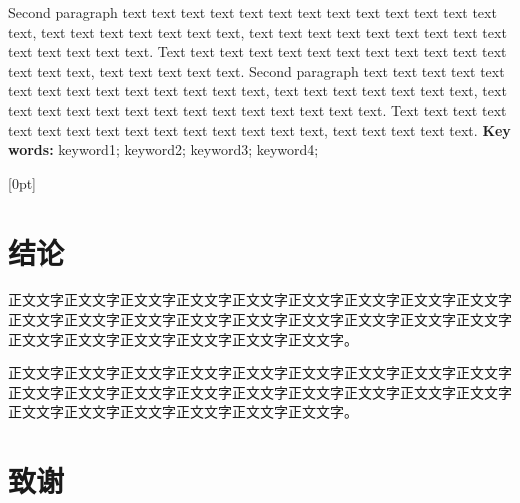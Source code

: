 \documentclass[
	StudentName     = ,
	StudentNameEng	= {{Name of Graduate (such as HAN Bao-cheng)}},
	AdvisorName     = {{姓名 职称}},
        AdvisorNameOut     = {{姓名 职称}},
	AdvisorNameEng	= {{Name of Supervisor and Title (such as Prof. FENG Chang-gen)}},
        AdvisorNameEngOut = {{Name of Second Supervisor and Title}},
	StudentID		= xxxxx,
	Major           = {{电子信息硕士}},
	ResearchInterest= {{计算机技术}},
	Department		= XXXX学院,
	DepartmentEng	= {{Name of Department (or School)}},
	SubmitYear		= 202X,
	SubmitMonth		= X,
	SubmitDay		= XX,
	DefenseYear		= 202X,
	DefenseMonth	= X,
	DefenseDay		= XX,
	DefenseDateEng  = {{Date of Submit (such as April 2002)}},
	Title           = {{基于深度强化学习的多无人机协同控制研究}},
	TitleEng        = {{English Title}},
	CLCNumber		= TD235,
	UDCNumber		= 624.152.5
]{cauc_thesis}
\begin{document}
    Second paragraph text text text text text text text text text text text text text text, text text text text text text text, text text text text text text text text text text text text text text. Text text text text text text text text text text text text text text text, text text text text text. Second paragraph text text text text text text text text text text text text text text, text text text text text text text, text text text text text text text text text text text text text text. Text text text text text text text text text text text text text text text, text text text text text.
\newline
{}\textbf{Key words: }\songti keyword1; keyword2; keyword3; keyword4;

\clearpage
\newpage
{}
\pagestyle{fancy}
[0pt] %
{\vspace{-50pt}\centering\Large\bfseries} %
{}
{}
{\vspace{20pt}} %
\tableofcontents

\newpage
\setcounter{page}{1}

\setlength{\headsep}{0.624cm}
\pagestyle{fancy}
\setlength{\baselineskip}{23.4pt}







{\centering \chapter *{结\quad\quad 论}}
正文文字正文文字正文文字正文文字正文文字正文文字正文文字正文文字正文文字正文文字正文文字正文文字正文文字正文文字正文文字正文文字正文文字正文文字正文文字正文文字正文文字正文文字正文文字正文文字。

正文文字正文文字正文文字正文文字正文文字正文文字正文文字正文文字正文文字正文文字正文文字正文文字正文文字正文文字正文文字正文文字正文文字正文文字正文文字正文文字正文文字正文文字正文文字正文文字。


{\centering \chapter *{致\qquad 谢}}
\end{document}
